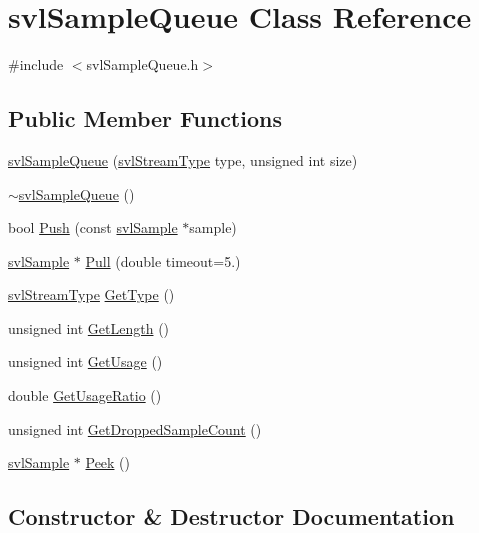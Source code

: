 \hypertarget{classsvl_sample_queue}{}\section{svl\+Sample\+Queue Class Reference}
\label{classsvl_sample_queue}


{\ttfamily \#include $<$svl\+Sample\+Queue.\+h$>$}

\subsection*{Public Member Functions}
\begin{DoxyCompactItemize}
\item 
\hyperlink{classsvl_sample_queue_a4886a27d8f75834e6bd60c24cf1907a4}{svl\+Sample\+Queue} (\hyperlink{svl_definitions_8h_aa00696d338a58db361335a01fd11e122}{svl\+Stream\+Type} type, unsigned int size)
\item 
\hyperlink{classsvl_sample_queue_a13e9cfdf1405c2c6aff5b5ba75d7119f}{$\sim$svl\+Sample\+Queue} ()
\item 
bool \hyperlink{classsvl_sample_queue_a35d3a585cc0a7dba64d32b94c14d6d7b}{Push} (const \hyperlink{classsvl_sample}{svl\+Sample} $\ast$sample)
\item 
\hyperlink{classsvl_sample}{svl\+Sample} $\ast$ \hyperlink{classsvl_sample_queue_a97403e218a8492f3fd942ebe36b64154}{Pull} (double timeout=5.)
\item 
\hyperlink{svl_definitions_8h_aa00696d338a58db361335a01fd11e122}{svl\+Stream\+Type} \hyperlink{classsvl_sample_queue_ab20419409ec77dd88b7c8688c56533c3}{Get\+Type} ()
\item 
unsigned int \hyperlink{classsvl_sample_queue_a1d14fefe5d0e874803aed6c4dbb2fd3b}{Get\+Length} ()
\item 
unsigned int \hyperlink{classsvl_sample_queue_afd06dad677a561c09b93331512eef86f}{Get\+Usage} ()
\item 
double \hyperlink{classsvl_sample_queue_a2c8cd815df98f2a4d8af8fe90c38be01}{Get\+Usage\+Ratio} ()
\item 
unsigned int \hyperlink{classsvl_sample_queue_a9008f1724bf2f9658afbbb6757347fed}{Get\+Dropped\+Sample\+Count} ()
\item 
\hyperlink{classsvl_sample}{svl\+Sample} $\ast$ \hyperlink{classsvl_sample_queue_ab13f89e8d39231c530b1a970cb472db5}{Peek} ()
\end{DoxyCompactItemize}


\subsection{Constructor \& Destructor Documentation}
\hypertarget{classsvl_sample_queue_a4886a27d8f75834e6bd60c24cf1907a4}{}
